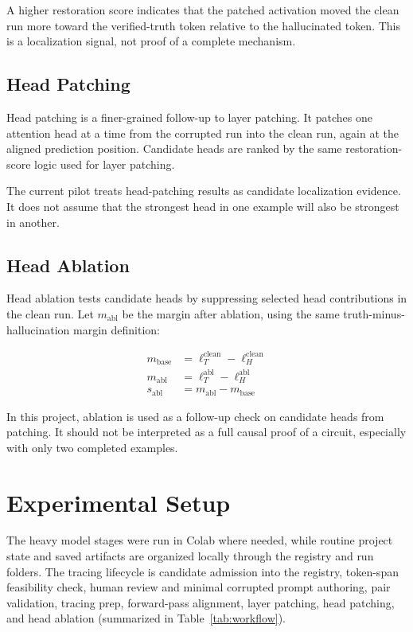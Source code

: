 \documentclass[11pt]{article}
\begin{document}
A higher restoration score indicates that the patched activation moved the clean run more toward the verified-truth token relative to the hallucinated token. This is a localization signal, not proof of a complete mechanism.

\subsection{Head Patching}

Head patching is a finer-grained follow-up to layer patching. It patches one attention head at a time from the corrupted run into the clean run, again at the aligned prediction position. Candidate heads are ranked by the same restoration-score logic used for layer patching.

The current pilot treats head-patching results as candidate localization evidence. It does not assume that the strongest head in one example will also be strongest in another.

\subsection{Head Ablation}

Head ablation tests candidate heads by suppressing selected head contributions in the clean run. Let $m_{\mathrm{abl}}$ be the margin after ablation, using the same truth-minus-hallucination margin definition:

\begin{align}
m_{\mathrm{base}} &= \ell_T^{\mathrm{clean}} - \ell_H^{\mathrm{clean}} \\
m_{\mathrm{abl}} &= \ell_T^{\mathrm{abl}} - \ell_H^{\mathrm{abl}} \\
s_{\mathrm{abl}} &= m_{\mathrm{abl}} - m_{\mathrm{base}}
\end{align}

In this project, ablation is used as a follow-up check on candidate heads from patching. It should not be interpreted as a full causal proof of a circuit, especially with only two completed examples.

\section{Experimental Setup}

The heavy model stages were run in Colab where needed, while routine project state and saved artifacts are organized locally through the registry and run folders. The tracing lifecycle is candidate admission into the registry, token-span feasibility check, human review and minimal corrupted prompt authoring, pair validation, tracing prep, forward-pass alignment, layer patching, head patching, and head ablation (summarized in Table~\ref{tab:workflow}).
\end{document}
